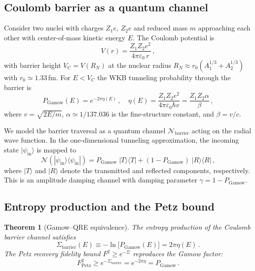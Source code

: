 \documentclass[prc,twocolumn,superscriptaddress,longbibliography,floatfix]{revtex4-2}
\newtheorem{theorem}{Theorem}
\newcommand{\chan}{\mathcal{N}}
\newcommand{\ket}[1]{|#1\rangle}
\newcommand{\bra}[1]{\langle#1|}
\newcommand{\PGam}{P_{\mathrm{Gamow}}}
\newcommand{\Sbar}{\Sigma_{\mathrm{barrier}}}
\newcommand{\VC}{V_{\mathrm{C}}}
\begin{document}
\subsection{Coulomb barrier as a quantum channel}

Consider two nuclei with charges $Z_{1}e$, $Z_{2}e$ and reduced mass
$m$ approaching each other with center-of-mass kinetic energy $E$.
The Coulomb potential is
\begin{equation}
V(r) = \frac{Z_{1}Z_{2}e^{2}}{4\pi\varepsilon_{0}\, r}\,,
\label{eq:coulomb}
\end{equation}
with barrier height $\VC = V(R_{N})$ at the nuclear radius
$R_{N} \approx r_{0}(A_{1}^{1/3}+A_{2}^{1/3})$ with
$r_{0}\simeq 1.33\,$fm.  For $E < \VC$
the WKB tunneling probability through the barrier is~\cite{Gamow1928}
\begin{equation}
\PGam(E) = e^{-2\pi\eta(E)}\,,\quad
\eta(E) = \frac{Z_{1}Z_{2}e^{2}}{4\pi\varepsilon_{0}\hbar v}
= \frac{Z_{1}Z_{2}\alpha}{\beta}\,,
\label{eq:gamow}
\end{equation}
where $v = \sqrt{2E/m}$, $\alpha \simeq 1/137.036$ is the fine-structure
constant, and $\beta = v/c$.

We model the barrier traversal as a quantum channel
$\chan_{\mathrm{barrier}}$ acting on the radial wave function.  In the
one-dimensional tunneling approximation, the incoming state
$\ket{\psi_{\mathrm{in}}}$ is mapped to
\begin{equation}
\chan(\ket{\psi_{\mathrm{in}}}\!\bra{\psi_{\mathrm{in}}})
= \PGam\;\ket{T}\!\bra{T} + (1-\PGam)\;\ket{R}\!\bra{R}\,,
\end{equation}
where $\ket{T}$ and $\ket{R}$ denote the transmitted and reflected
components, respectively.  This is an amplitude damping channel with
damping parameter $\gamma = 1 - \PGam$.

\subsection{Entropy production and the Petz bound}

\begin{theorem}[Gamow--QRE equivalence]
\label{thm:gamow_qre}
The entropy production of the Coulomb barrier channel satisfies
\begin{equation}
\Sbar(E) \equiv -\ln\!\bigl[\PGam(E)\bigr] = 2\pi\eta(E)\,.
\label{eq:gamow_qre}
\end{equation}
The Petz recovery fidelity bound $F^{2}\geq e^{-\Sigma}$
reproduces the Gamow factor:
\begin{equation}
F^{2}_{\mathrm{Petz}} \geq e^{-\Sbar} = e^{-2\pi\eta} = \PGam\,.
\label{eq:petz_gamow}
\end{equation}
\end{theorem}
\end{document}
